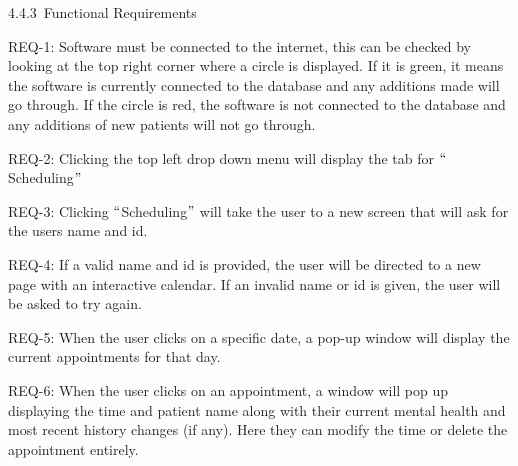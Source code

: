 \documentclass[12pt]{article}
\renewcommand{\_}{\kern-1.5pt\textunderscore\kern-1.5pt}
\begin{document}
4.4.3\  \tab Functional Requirements\par

\begin{adjustwidth}{0.5in}{0.0in}
REQ-1: Software must be connected to the internet, this can be checked by looking at the top right corner where a circle is displayed. If it is green, it means the software is currently connected to the database and any additions made will go through. If the circle is red, the software is not connected to the database and any additions of new patients will not go through.\par

\end{adjustwidth}

\begin{adjustwidth}{0.5in}{0.0in}
REQ-2: Clicking the top left drop down menu will display the tab for $``$Scheduling$"$ \par

\end{adjustwidth}

\begin{adjustwidth}{0.5in}{0.0in}
REQ-3: Clicking $``$Scheduling$"$  will take the user to a new screen that will ask for the users name and id.\par

\end{adjustwidth}

\begin{adjustwidth}{0.5in}{0.0in}
REQ-4: If a valid name and id is provided, the user will be directed to a new page with an interactive calendar. If an invalid name or id is given, the user will be asked to try again.\par

\end{adjustwidth}

\begin{adjustwidth}{0.5in}{0.0in}
REQ-5: When the user clicks on a specific date, a pop-up window will display the current appointments for that day.\par

\end{adjustwidth}

\begin{adjustwidth}{0.5in}{0.0in}
REQ-6: When the user clicks on an appointment, a window will pop up displaying the time and patient name along with their current mental health and most recent history changes (if any). Here they can modify the time or delete the appointment entirely.\par

\end{adjustwidth}
\end{document}
